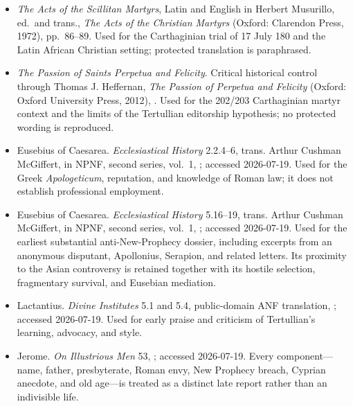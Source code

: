 \begin{itemize}
\item \emph{The Acts of the Scillitan Martyrs}, Latin and English in Herbert
Musurillo, ed.~and trans., \emph{The Acts of the Christian Martyrs} (Oxford:
Clarendon Press, 1972), pp.~86--89. Used for the Carthaginian trial of 17 July
180 and the Latin African Christian setting; protected translation is
paraphrased.

\item \emph{The Passion of Saints Perpetua and Felicity}. Critical historical
control through Thomas J. Heffernan, \emph{The Passion of Perpetua and Felicity}
(Oxford: Oxford University Press, 2012),
. Used for the
202/203 Carthaginian martyr context and the limits of the Tertullian editorship
hypothesis; no protected wording is reproduced.

\item Eusebius of Caesarea. \emph{Ecclesiastical History} 2.2.4--6, trans.
Arthur Cushman McGiffert, in NPNF, second series, vol.~1,
; accessed
2026-07-19. Used for the Greek \emph{Apologeticum}, reputation, and knowledge
of Roman law; it does not establish professional employment.

\item Eusebius of Caesarea. \emph{Ecclesiastical History} 5.16--19, trans.
Arthur Cushman McGiffert, in NPNF, second series, vol.~1,
; accessed
2026-07-19. Used for the earliest substantial anti-New-Prophecy dossier,
including excerpts from an anonymous disputant, Apollonius, Serapion, and
related letters. Its proximity to the Asian controversy is retained together
with its hostile selection, fragmentary survival, and Eusebian mediation.

\item Lactantius. \emph{Divine Institutes} 5.1 and 5.4, public-domain ANF
translation,
; accessed
2026-07-19. Used for early praise and criticism of Tertullian's learning,
advocacy, and style.

\item Jerome. \emph{On Illustrious Men} 53,
; accessed 2026-07-19. Every component---name,
father, presbyterate, Roman envy, New Prophecy breach, Cyprian anecdote, and old
age---is treated as a distinct late report rather than an indivisible life.


\end{itemize}
